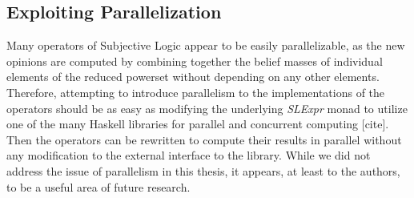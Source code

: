\documentclass[thesis.tex]{subfiles}
\begin{document}
\subsection{Exploiting Parallelization}

Many operators of Subjective Logic appear to be easily parallelizable,
as the new opinions are computed by combining together the belief
masses of individual elements of the reduced powerset without
depending on any other elements. Therefore, attempting to introduce
parallelism to the implementations of the operators should be as easy
as modifying the underlying \emph{SLExpr} monad to utilize one of the
many Haskell libraries for parallel and concurrent computing
[cite]. Then the operators can be rewritten to compute their results
in parallel without any modification to the external interface to the
library. While we did not address the issue of parallelism in this
thesis, it appears, at least to the authors, to be a useful area of
future research.
\end{document}
